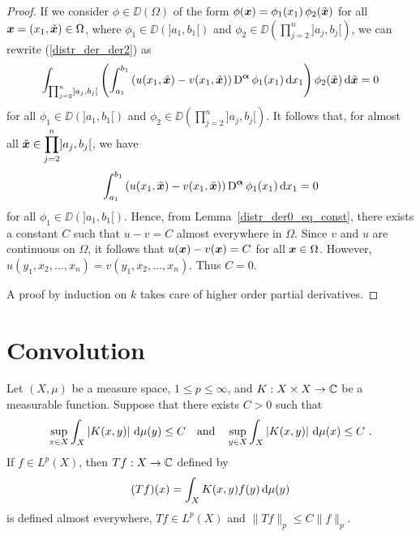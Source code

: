 \begin{proof}
If we consider $\phi \in \DD(\Omega)$ of the form
$\displaystyle \phi({\bm{x}}) = \phi_1(x_1) \, \phi_2(\tilde{{\bm{x}}})$ for all
${\bm{x}} = (x_1,\tilde{{\bm{x}}}) \in \Omega$, where
$\phi_1 \in \DD(]a_1,b_1[)$ and
$\displaystyle \phi_2 \in \DD\left(\prod_{j=2}^n]a_j,b_j[\right)$, we
can rewrite (\ref{distr_der_der2}) as
\[
\int_{\prod_{j=2}^n]a_j,b_j[} \left( \int_{a_1}^{b_1}
\left(u(x_1,\tilde{{\bm{x}}}) - v(x_1,\tilde{{\bm{x}}})\right)
\operatorname{D}^{{\bm{\alpha}}} \phi_1(x_1) \,\mathrm{d}{x_1} \right) \phi_2(\tilde{{\bm{x}}})
\,\mathrm{d}{\tilde{{\bm{x}}}} = 0
\]
for all $\phi_1 \in \DD(]a_1,b_1[)$ and
$\displaystyle \phi_2 \in \DD\left(\prod_{j=2}^n]a_j,b_j[\right)$.
It follows that, for almost all
$\displaystyle \tilde{{\bm{x}}} \in \prod_{j=2}^n]a_j,b_j[$, we have
\[
\int_{a_1}^{b_1}
\left(u(x_1,\tilde{{\bm{x}}}) - v(x_1,\tilde{{\bm{x}}})\right) \operatorname{D}^{{\bm{\alpha}}}
\phi_1(x_1) \,\mathrm{d}{x_1} = 0
\]
for all $\phi_1 \in \DD(]a_1,b_1[)$.
Hence, from Lemma~\ref{distr_der0_eq_const}, there exists a constant $C$ such
that $u-v = C$ almost everywhere in $\Omega$.  Since $v$ and $u$ are
continuous on $\Omega$, it follows that
$u({\bm{x}})-v({\bm{x}}) = C$ for all ${\bm{x}} \in \Omega$.
However, $u(y_1,x_2,\ldots,x_n) = v(y_1,x_2, \ldots,x_n)$.  Thus
$C=0$.

 A proof by induction on $k$ takes care of
higher order partial derivatives.
\end{proof}

\section{Convolution} \label{sectConvolution}

\begin{theorem} \label{distr_GyoungI}
Let $\left(X,\mu\right)$ be a measure space,
$1\leq p \leq \infty$, and $K:X\times X \rightarrow \mathbb{C}$ be a
measurable function.  Suppose that there exists $C>0$ such that
\[
\sup_{x\in X} \int_X \left|K(x,y)\right| \,\mathrm{d}{\mu(y)} \leq C
\quad \text{and} \quad
\sup_{y\in X} \int_X \left|K(x,y)\right| \,\mathrm{d}{\mu(x)} \leq C \ .
\]
If $\displaystyle f \in L^p(X)$, then $Tf:X\rightarrow \mathbb{C}$ defined by
\[
(Tf)(x) = \int_X K(x,y)f(y) \,\mathrm{d}{\mu(y)}
\]
is defined almost everywhere, $\displaystyle Tf \in L^p(X)$ and
$\displaystyle \| Tf \|_p \leq C \|f\|_p$.
\end{theorem}

